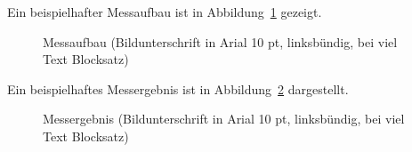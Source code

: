 Ein beispielhafter Messaufbau ist in Abbildung~\ref{fig:aufbau} gezeigt.

\begin{figure}
	\centering
	\caption{Messaufbau (Bildunterschrift in Arial 10 pt, linksbündig, bei viel Text Blocksatz)}
	\label{fig:aufbau}
\end{figure}

Ein beispielhaftes Messergebnis ist in Abbildung~\ref{fig:ergebnis} dargestellt.

\begin{figure}
	\centering
	\caption{Messergebnis (Bildunterschrift in Arial 10 pt, linksbündig, bei viel Text Blocksatz)}
	\label{fig:ergebnis}
\end{figure}

%

